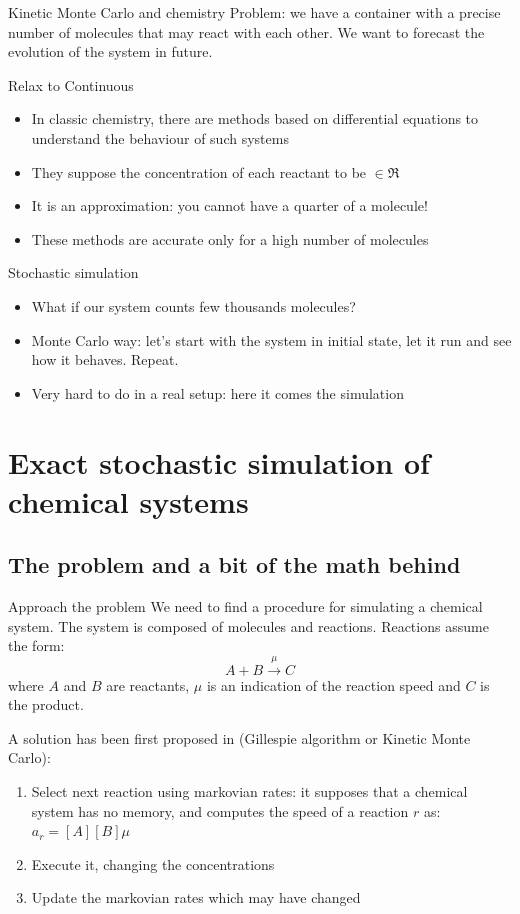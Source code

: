 \documentclass[presentation]{beamer}
\begin{document}
\begin{frame}{Kinetic Monte Carlo and chemistry}
Problem: we have a container with a precise number of molecules that may react with each other. We want to forecast the evolution of the system in future.
 \begin{block}{Relax to Continuous}
  \begin{itemize}
        \item In classic chemistry, there are methods based on differential equations to understand the behaviour of such systems
        \item They suppose the concentration of each reactant to be $\in \Re$
        \item It is an approximation: you cannot have a quarter of a molecule!
        \item These methods are accurate only for a high number of molecules
  \end{itemize}
 \end{block}
 \begin{block}{Stochastic simulation}
  \begin{itemize}
        \item What if our system counts few thousands molecules?
        \item Monte Carlo way: let's start with the system in initial state, let it run and see how it behaves. Repeat.
        \item Very hard to do in a real setup: here it comes the simulation
  \end{itemize}
 \end{block}
\end{frame}

\section{Exact stochastic simulation of chemical systems}
\subsection{The problem and a bit of the math behind}
\begin{frame}{Approach the problem}
We need to find a procedure for simulating a chemical system. The system is composed of molecules and reactions. Reactions assume the form:
$$A + B\xrightarrow{\mu} C$$
where $A$ and $B$ are reactants, $\mu$ is an indication of the reaction speed and $C$ is the product.

A solution has been first proposed in \cite{GillespieJPC1977} (Gillespie algorithm or Kinetic Monte Carlo):
 \begin{enumerate}
   \item Select next reaction using markovian rates: it supposes that a chemical system has no memory, and computes the speed of a reaction $r$ as: $a_r = [A][B]\mu$
   \item Execute it, changing the concentrations
   \item Update the markovian rates which may have changed
  \end{enumerate}
\end{frame}
\end{document}
